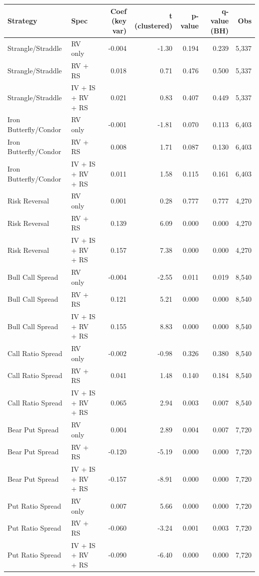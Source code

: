 \begin{tabular}{llrrrrr}
\toprule
Strategy & Spec & Coef (key var) & t (clustered) & p-value & q-value (BH) & Obs \\
\midrule
Strangle/Straddle & RV only & -0.004 & -1.30 & 0.194 & 0.239 & 5,337 \\
Strangle/Straddle & RV + RS & 0.018 & 0.71 & 0.476 & 0.500 & 5,337 \\
Strangle/Straddle & IV + IS + RV + RS & 0.021 & 0.83 & 0.407 & 0.449 & 5,337 \\
Iron Butterfly/Condor & RV only & -0.001 & -1.81 & 0.070 & 0.113 & 6,403 \\
Iron Butterfly/Condor & RV + RS & 0.008 & 1.71 & 0.087 & 0.130 & 6,403 \\
Iron Butterfly/Condor & IV + IS + RV + RS & 0.011 & 1.58 & 0.115 & 0.161 & 6,403 \\
Risk Reversal & RV only & 0.001 & 0.28 & 0.777 & 0.777 & 4,270 \\
Risk Reversal & RV + RS & 0.139 & 6.09 & 0.000 & 0.000 & 4,270 \\
Risk Reversal & IV + IS + RV + RS & 0.157 & 7.38 & 0.000 & 0.000 & 4,270 \\
Bull Call Spread & RV only & -0.004 & -2.55 & 0.011 & 0.019 & 8,540 \\
Bull Call Spread & RV + RS & 0.121 & 5.21 & 0.000 & 0.000 & 8,540 \\
Bull Call Spread & IV + IS + RV + RS & 0.155 & 8.83 & 0.000 & 0.000 & 8,540 \\
Call Ratio Spread & RV only & -0.002 & -0.98 & 0.326 & 0.380 & 8,540 \\
Call Ratio Spread & RV + RS & 0.041 & 1.48 & 0.140 & 0.184 & 8,540 \\
Call Ratio Spread & IV + IS + RV + RS & 0.065 & 2.94 & 0.003 & 0.007 & 8,540 \\
Bear Put Spread & RV only & 0.004 & 2.89 & 0.004 & 0.007 & 7,720 \\
Bear Put Spread & RV + RS & -0.120 & -5.19 & 0.000 & 0.000 & 7,720 \\
Bear Put Spread & IV + IS + RV + RS & -0.157 & -8.91 & 0.000 & 0.000 & 7,720 \\
Put Ratio Spread & RV only & 0.007 & 5.66 & 0.000 & 0.000 & 7,720 \\
Put Ratio Spread & RV + RS & -0.060 & -3.24 & 0.001 & 0.003 & 7,720 \\
Put Ratio Spread & IV + IS + RV + RS & -0.090 & -6.40 & 0.000 & 0.000 & 7,720 \\
\bottomrule
\end{tabular}
